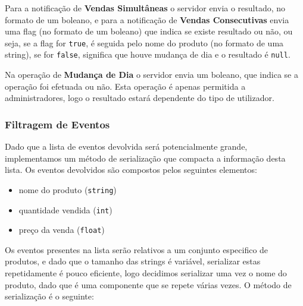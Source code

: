 \documentclass[11pt, a4paper, fleqn]{article}
\begin{document}
	Para a notificação de \textbf{Vendas Simultâneas} o servidor envia  o resultado, no formato de um boleano, e para a notificação de \textbf{Vendas Consecutivas} envia uma flag (no formato de um boleano) que indica se existe resultado ou não, ou seja, se a flag for \texttt{true}, é seguida pelo nome do produto (no formato de uma string), se for \texttt{false}, significa que houve mudança de dia e o resultado é \texttt{null}.
	
	Na operação de \textbf{Mudança de Dia} o servidor envia um boleano, que indica se a operação foi efetuada ou não. Esta operação é apenas permitida a administradores, logo o resultado estará dependente do tipo de utilizador.
	
	\subsubsection{Filtragem de Eventos}
	\label{sec:proto-filtragem}
	
	
	Dado que a lista de eventos devolvida será potencialmente grande, implementamos um método de serialização que compacta a informação desta lista. Os eventos devolvidos são compostos pelos seguintes elementos:
	\begin{itemize}
		\item nome do produto (\texttt{string})
		\item quantidade vendida (\texttt{int})
		\item preço da venda (\texttt{float})
	\end{itemize}
	
	Os eventos presentes na lista serão relativos a um conjunto especifico de produtos, e dado que o tamanho das strings é variável, serializar estas repetidamente é pouco eficiente, logo decidimos serializar uma vez o nome do produto, dado que é uma componente que se repete várias vezes. O método de serialização é o seguinte:
	
\end{document}
